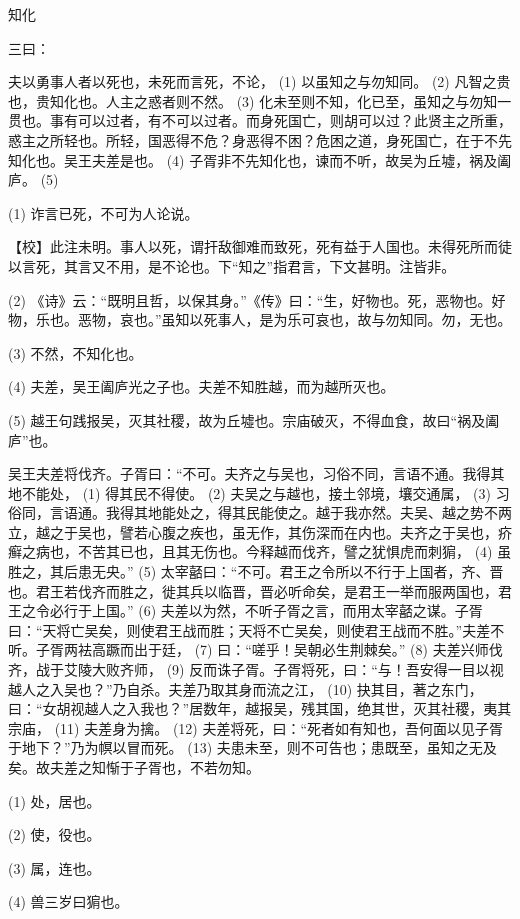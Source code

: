 \documentclass[12pt,UTF8]{ctexbook}
\begin{document}
知化


三曰：

夫以勇事人者以死也，未死而言死，不论， (1) 以虽知之与勿知同。 (2) 凡智之贵也，贵知化也。人主之惑者则不然。 (3) 化未至则不知，化已至，虽知之与勿知一贯也。事有可以过者，有不可以过者。而身死国亡，则胡可以过？此贤主之所重，惑主之所轻也。所轻，国恶得不危？身恶得不困？危困之道，身死国亡，在于不先知化也。吴王夫差是也。 (4) 子胥非不先知化也，谏而不听，故吴为丘墟，祸及阖庐。 (5)

(1) 诈言已死，不可为人论说。

【校】此注未明。事人以死，谓扞敌御难而致死，死有益于人国也。未得死所而徒以言死，其言又不用，是不论也。下“知之”指君言，下文甚明。注皆非。

(2) 《诗》云：“既明且哲，以保其身。”《传》曰：“生，好物也。死，恶物也。好物，乐也。恶物，哀也。”虽知以死事人，是为乐可哀也，故与勿知同。勿，无也。

(3) 不然，不知化也。

(4) 夫差，吴王阖庐光之子也。夫差不知胜越，而为越所灭也。

(5) 越王句践报吴，灭其社稷，故为丘墟也。宗庙破灭，不得血食，故曰“祸及阖庐”也。

吴王夫差将伐齐。子胥曰：“不可。夫齐之与吴也，习俗不同，言语不通。我得其地不能处， (1) 得其民不得使。 (2) 夫吴之与越也，接土邻境，壤交通属， (3) 习俗同，言语通。我得其地能处之，得其民能使之。越于我亦然。夫吴、越之势不两立，越之于吴也，譬若心腹之疾也，虽无作，其伤深而在内也。夫齐之于吴也，疥癣之病也，不苦其已也，且其无伤也。今释越而伐齐，譬之犹惧虎而刺猏， (4) 虽胜之，其后患无央。” (5) 太宰嚭曰：“不可。君王之令所以不行于上国者，齐、晋也。君王若伐齐而胜之，徙其兵以临晋，晋必听命矣，是君王一举而服两国也，君王之令必行于上国。” (6) 夫差以为然，不听子胥之言，而用太宰嚭之谋。子胥曰：“天将亡吴矣，则使君王战而胜；天将不亡吴矣，则使君王战而不胜。”夫差不听。子胥两袪高蹶而出于廷， (7) 曰：“嗟乎！吴朝必生荆棘矣。” (8) 夫差兴师伐齐，战于艾陵大败齐师， (9) 反而诛子胥。子胥将死，曰：“与！吾安得一目以视越人之入吴也？”乃自杀。夫差乃取其身而流之江， (10) 抉其目，著之东门，曰：“女胡视越人之入我也？”居数年，越报吴，残其国，绝其世，灭其社稷，夷其宗庙， (11) 夫差身为擒。 (12) 夫差将死，曰：“死者如有知也，吾何面以见子胥于地下？”乃为幎以冒而死。 (13) 夫患未至，则不可告也；患既至，虽知之无及矣。故夫差之知惭于子胥也，不若勿知。

(1) 处，居也。

(2) 使，役也。

(3) 属，连也。

(4) 兽三岁曰猏也。
\end{document}
